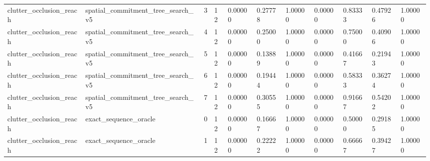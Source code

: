 \documentclass{article}
\begin{document}
\begin{table}[tbp]
{\begin{tabular}{lllllllllll}
clutter\_occlusion\_reach & spatial\_commitment\_tree\_search\_v5 & 3 & 12 & 0.00000 & 0.27778 & 1.00000 & 0.00000 & 0.83333 & 0.47926 & 1.00000 \\
clutter\_occlusion\_reach & spatial\_commitment\_tree\_search\_v5 & 4 & 12 & 0.00000 & 0.25000 & 1.00000 & 0.00000 & 0.75000 & 0.40906 & 1.00000 \\
clutter\_occlusion\_reach & spatial\_commitment\_tree\_search\_v5 & 5 & 12 & 0.00000 & 0.13889 & 1.00000 & 0.00000 & 0.41667 & 0.21943 & 1.00000 \\
clutter\_occlusion\_reach & spatial\_commitment\_tree\_search\_v5 & 6 & 12 & 0.00000 & 0.19444 & 1.00000 & 0.00000 & 0.58333 & 0.36274 & 1.00000 \\
clutter\_occlusion\_reach & spatial\_commitment\_tree\_search\_v5 & 7 & 12 & 0.00000 & 0.30555 & 1.00000 & 0.00000 & 0.91667 & 0.54202 & 1.00000 \\
clutter\_occlusion\_reach & exact\_sequence\_oracle & 0 & 12 & 0.00000 & 0.16667 & 1.00000 & 0.00000 & 0.50000 & 0.29185 & 1.00000 \\
clutter\_occlusion\_reach & exact\_sequence\_oracle & 1 & 12 & 0.00000 & 0.22222 & 1.00000 & 0.00000 & 0.66667 & 0.39427 & 1.00000 \\
\bottomrule
\end{tabular}
}
\end{table}

\clearpage
\end{document}
